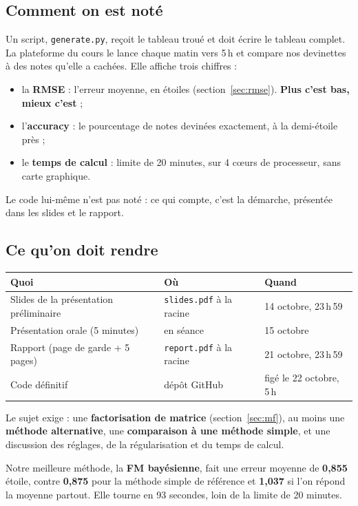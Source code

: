 \documentclass[11pt,a4paper]{article}
\begin{document}
\subsection{Comment on est noté}

Un script, \texttt{generate.py}, reçoit le tableau troué et doit écrire le tableau
complet. La plateforme du cours le lance chaque matin vers 5\,h et compare nos
devinettes à des notes qu'elle a cachées. Elle affiche trois chiffres :
\begin{itemize}
  \item la \textbf{RMSE} : l'erreur moyenne, en étoiles (section~\ref{sec:rmse}).
        \textbf{Plus c'est bas, mieux c'est} ;
  \item l'\textbf{accuracy} : le pourcentage de notes devinées exactement, à la demi-étoile près ;
  \item le \textbf{temps de calcul} : limite de 20 minutes, sur 4 c\oe urs de processeur,
        sans carte graphique.
\end{itemize}
Le code lui-même n'est pas noté : ce qui compte, c'est la démarche, présentée
dans les slides et le rapport.

\subsection{Ce qu'on doit rendre}

\begin{center}
\begin{tabular}{lll}
\toprule
\textbf{Quoi} & \textbf{Où} & \textbf{Quand} \\
\midrule
Slides de la présentation préliminaire & \texttt{slides.pdf} à la racine & 14 octobre, 23\,h\,59 \\
Présentation orale (5 minutes) & en séance & 15 octobre \\
Rapport (page de garde + 5 pages) & \texttt{report.pdf} à la racine & 21 octobre, 23\,h\,59 \\
Code définitif & dépôt GitHub & figé le 22 octobre, 5\,h \\
\bottomrule
\end{tabular}
\end{center}

Le sujet exige : une \textbf{factorisation de matrice} (section~\ref{sec:mf}), au moins
une \textbf{méthode alternative}, une \textbf{comparaison à une méthode simple}, et une
discussion des réglages, de la régularisation et du temps de calcul.

\begin{retenir}
Notre meilleure méthode, la \textbf{FM bayésienne}, fait une erreur moyenne de
\textbf{0,855} étoile, contre \textbf{0,875} pour la méthode simple de référence
et \textbf{1,037} si l'on répond la moyenne partout. Elle tourne en 93 secondes,
loin de la limite de 20 minutes.
\end{retenir}
\end{document}
